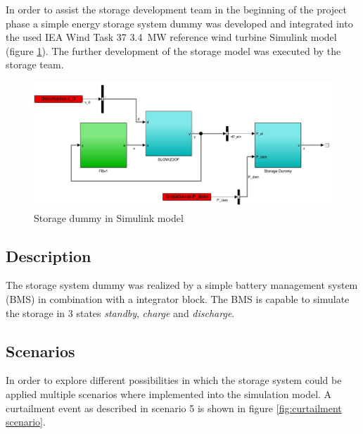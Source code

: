 In order to assist the storage development team in the beginning of the project phase a simple energy storage system dummy was developed and integrated into the used IEA Wind Task 37 \SI{3.4}{MW} reference wind turbine Simulink model (figure \ref{fig:Storage dummy}).
The further development of the storage model was executed by the storage team.

\begin{figure}[tbh]
	\centering	
	\includegraphics[width=12cm]{Figures/StorageDummy}
	\caption{Storage dummy in Simulink model}
	\label{fig:Storage dummy}
\end{figure} 

\subsection{Description}
The storage system dummy was realized by a simple battery management system (BMS) in combination with a integrator block.
The BMS is capable to simulate the storage in 3 states \textit{standby}, \textit{charge} and \textit{discharge}.

\subsection{Scenarios}
In order to explore different possibilities in which the storage system could be applied multiple scenarios where implemented into the simulation model.
A curtailment event as described in scenario 5 is shown in figure \ref{fig:curtailment scenario}.

